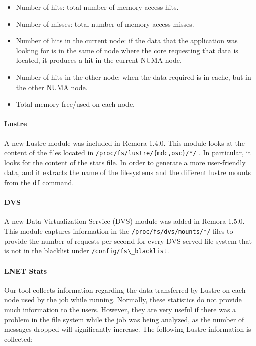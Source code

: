 \documentclass[10pt,a4paper]{report}
\begin{document}
\begin{itemize}
	\item Number of hits: total number of memory access hits. 
	\item Number of misses: total number of memory access misses. 
	\item Number of hits in the current node: if the data that the application was looking for is in the same of node where the core requesting that data is located, it produces a hit in the current NUMA node.
	\item Number of hits in the other node: when the data required is in cache, but in the other NUMA node.
	\item Total memory free/used on each node.
\end{itemize}


\paragraph{Lustre} 

A new Lustre module was included in Remora 1.4.0. This module looks at the content of the files located in \verb+/proc/fs/lustre/{mdc,osc}/*/+ . In particular, it looks for the content of the stats file. In order to generate a more user-friendly data, and it extracts the name of the filesystems and the different lustre mounts from the \texttt{df} command.

\paragraph{DVS}

A new Data Virtualization Service (DVS) module was added in Remora 1.5.0. This module captures information in the \verb+/proc/fs/dvs/mounts/*/+ files to provide the number of requests per second for every DVS served file system that is not in the blacklist under \verb+/config/fs\_blacklist+.


\paragraph{LNET Stats}
Our tool collects information regarding the data transferred by Lustre on each node used by the job while running. Normally, these statistics do not provide much information to the users. However, they are very useful if there was a problem in the file system while the job was being analyzed, as the number of messages dropped will significantly increase. The following Lustre information is collected:
\end{document}
